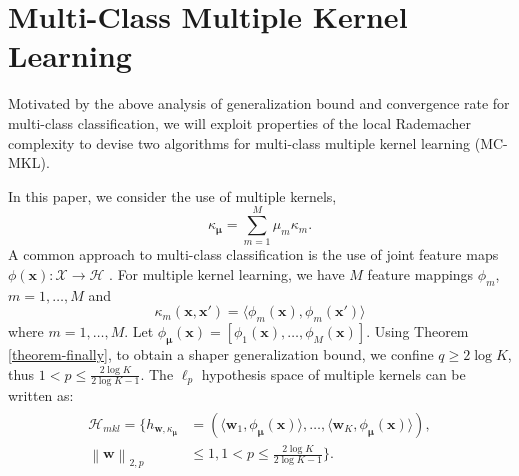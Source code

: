 \documentclass{article}
\begin{document}
\section{Multi-Class Multiple Kernel Learning}
Motivated by the above analysis of generalization bound and convergence rate for multi-class classification,
we will exploit properties of the local Rademacher complexity
to devise two algorithms for multi-class multiple kernel learning (MC-MKL).

In this paper, we consider the use of multiple kernels,
$$\kappa_{\bm \mu}=\sum_{m=1}^M \mu_m\kappa_m.$$
A common approach to multi-class classification is the use of joint feature
maps $\phi(\mathbf x):\mathcal X \to \mathcal H$ \cite{TsochantaridisHJA04}.
For multiple kernel learning, we have $M$ feature mappings $\phi_m$, $m=1,\ldots,M$ and
$$\kappa_m(\mathbf x,\mathbf x')=\langle \phi_m(\mathbf x), \phi_m(\mathbf x')\rangle$$
where $m=1,\ldots,M$.
Let $\phi_{\bm \mu}(\mathbf x)=[\phi_1(\mathbf x),\ldots,\phi_M(\mathbf x)]$.
Using Theorem \ref{theorem-finally}, to obtain a shaper generalization bound,
we confine $q \geq 2\log K$, thus $1 < p \leq \frac{2\log K}{2\log K-1}$.
The $\ell_p$ hypothesis space of multiple kernels can be written as:
 \begin{align*}
 \label{hypothspapcemkl}
   \begin{aligned}
   \mathcal{H}_{mkl}=\Big\{h_{\mathbf{w},\kappa_{\bm \mu}}&=\left(\langle \mathbf w_1,\phi_{\bm \mu}(\mathbf x)\rangle,\ldots, \langle\mathbf w_K,\phi_{\bm \mu}(\mathbf x)\rangle\right),\\
   \left\|\mathbf  w \right\|_{2,p}&\leq 1, 1 < p \leq \frac{2\log K}{2\log K-1}
  \Big\}.
   \end{aligned}
 \end{align*}
\end{document}
